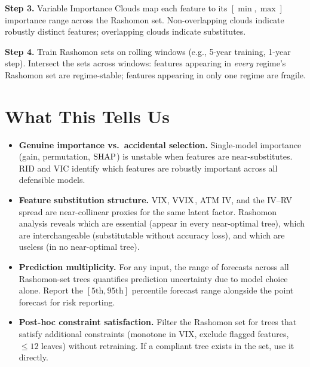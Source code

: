 \textbf{Step 3.}
Variable Importance Clouds \citep{DongRudin2020} map each feature to its $[\min, \max]$ importance range across the Rashomon set.
Non-overlapping clouds indicate robustly distinct features; overlapping clouds indicate substitutes.

\textbf{Step 4.}
Train Rashomon sets on rolling windows (e.g., 5-year training, 1-year step).
Intersect the sets across windows: features appearing in \emph{every} regime's Rashomon set are regime-stable; features appearing in only one regime are fragile.


\section{What This Tells Us}
\label{sec:rashomon-insights}

\begin{itemize}[nosep]
  \item \textbf{Genuine importance vs.\ accidental selection.}
    Single-model importance (gain, permutation, $\operatorname{SHAP}$) is unstable when features are near-substitutes.
    RID and VIC identify which features are robustly important across all defensible models.

  \item \textbf{Feature substitution structure.}
    VIX, $\operatorname{VVIX}$, ATM IV, and the IV--RV spread are near-collinear proxies for the same latent factor.
    Rashomon analysis reveals which are essential (appear in every near-optimal tree), which are interchangeable (substitutable without accuracy loss), and which are useless (in no near-optimal tree).

  \item \textbf{Prediction multiplicity.}
    For any input, the range of forecasts across all Rashomon-set trees quantifies prediction uncertainty due to model choice alone.
    Report the $[5\text{th}, 95\text{th}]$ percentile forecast range alongside the point forecast for risk reporting.

  \item \textbf{Post-hoc constraint satisfaction.}
    Filter the Rashomon set for trees that satisfy additional constraints (monotone in VIX, exclude flagged features, $\leq 12$ leaves) without retraining.
    If a compliant tree exists in the set, use it directly.
\end{itemize}


